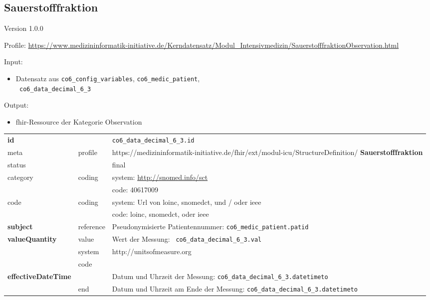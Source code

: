 \subsection{Sauerstofffraktion} 
\noindent Version 1.0.0

\noindent Profile: \url{https://www.medizininformatik-initiative.de/Kerndatensatz/Modul_Intensivmedizin/SauerstofffraktionObservation.html}

\noindent Input:
\begin{itemize}
	\item Datensatz aus \texttt{co6\_config\_variables}, \texttt{co6\_medic\_patient}, \\ \texttt{
co6\_data\_decimal\_6\_3}
\end{itemize}
Output:
\begin{itemize}
        \item \ac{fhir}-Ressource der Kategorie \glqq Observation\grqq{}
\end{itemize}
\begin{longtable}{|l|l|p{7.5cm}|}
        \hline
        \rowcolor{lightgray} \multicolumn{3}{|l|}{Data Mapping (inhaltlich)} \\ \hline
        \textbf{id} &  & \texttt{co6\_data\_decimal\_6\_3.id} \\ \hline
	meta & profile & https://medizininformatik-initiative.de/fhir/ext/modul-icu/StructureDefinition/\textbf{
Sauerstofffraktion} \\ \hline 
	status &  & final   \\ \hline 
	category & coding & system: \url{http://snomed.info/sct} \\
\cline{3-3}
	& & code: 40617009 \\ \hline
	code & coding & system: Url von \ac{loinc}, \ac{snomedct}, und / oder \ac{ieee} \\ 
	\cline{3-3} 
	 &  & code: \ac{loinc}, \ac{snomedct}, oder \ac{ieee} \\ \hline
	 \textbf{subject}  & reference & Pseudonymisierte Patientennummer: \texttt{co6\_medic\_patient.patid} \\ \hline
	 \textbf{valueQuantity}  & value & Wert der Messung: \texttt{
co6\_data\_decimal\_6\_3.val} \\
        \cline{2-3}
         & system & http://unitsofmeasure.org \\
         \cline{2-3}
         & code & \\ \hline
     \textbf{effectiveDateTime}  & & Datum und Uhrzeit der Messung: \texttt{co6\_data\_decimal\_6\_3.datetimeto} \\
    \cline{2-3}
     & end & Datum und Uhrzeit am Ende der Messung: \texttt{co6\_data\_decimal\_6\_3.datetimeto} \\ \hline
\end{longtable}


